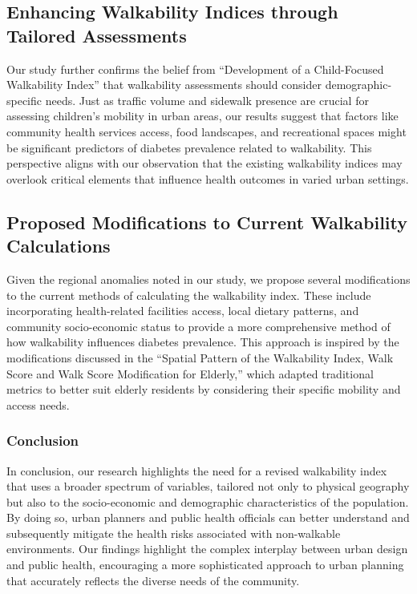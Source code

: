 \documentclass[
]{article}
\begin{document}
\subsection{Enhancing Walkability Indices through Tailored
Assessments}\label{enhancing-walkability-indices-through-tailored-assessments}

Our study further confirms the belief from ``Development of a
Child-Focused Walkability Index'' that walkability assessments should
consider demographic-specific needs. Just as traffic volume and sidewalk
presence are crucial for assessing children's mobility in urban areas,
our results suggest that factors like community health services access,
food landscapes, and recreational spaces might be significant predictors
of diabetes prevalence related to walkability. This perspective aligns
with our observation that the existing walkability indices may overlook
critical elements that influence health outcomes in varied urban
settings.

\subsection{Proposed Modifications to Current Walkability
Calculations}\label{proposed-modifications-to-current-walkability-calculations}

Given the regional anomalies noted in our study, we propose several
modifications to the current methods of calculating the walkability
index. These include incorporating health-related facilities access,
local dietary patterns, and community socio-economic status to provide a
more comprehensive method of how walkability influences diabetes
prevalence. This approach is inspired by the modifications discussed in
the ``Spatial Pattern of the Walkability Index, Walk Score and Walk
Score Modification for Elderly,'' which adapted traditional metrics to
better suit elderly residents by considering their specific mobility and
access needs.

\subsubsection{Conclusion}\label{conclusion}

In conclusion, our research highlights the need for a revised
walkability index that uses a broader spectrum of variables, tailored
not only to physical geography but also to the socio-economic and
demographic characteristics of the population. By doing so, urban
planners and public health officials can better understand and
subsequently mitigate the health risks associated with non-walkable
environments. Our findings highlight the complex interplay between urban
design and public health, encouraging a more sophisticated approach to
urban planning that accurately reflects the diverse needs of the
community.
\end{document}
